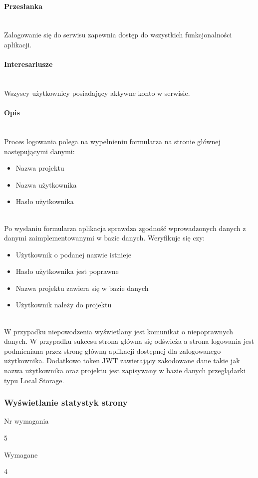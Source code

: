 \documentclass[eng,printmode]{mgr}
\begin{document}
\paragraph{Przesłanka}\ \\
Zalogowanie się do serwisu zapewnia dostęp do wszystkich funkcjonalności aplikacji.

\paragraph{Interesariusze}\ \\
Wszyscy użytkownicy posiadający aktywne konto w serwisie.

\paragraph{Opis}\ \\
Proces logowania polega na wypełnieniu formularza na stronie głównej następującymi danymi:
\begin{itemize}
	\item[--] Nazwa projektu
	\item[--] Nazwa użytkownika
	\item[--] Hasło użytkownika
\end{itemize}
\ \\
Po wysłaniu formularza aplikacja sprawdza zgodność wprowadzonych danych z danymi zaimplementowanymi w bazie danych. Weryfikuje się czy:
\begin{itemize}
	\item[--] Użytkownik o podanej nazwie istnieje
	\item[--] Hasło użytkownika jest poprawne
	\item[--] Nazwa projektu zawiera się w bazie danych
	\item[--] Użytkownik należy do projektu
\end{itemize}
\ \\
W przypadku niepowodzenia wyświetlany jest komunikat o niepoprawnych danych. W przypadku sukcesu strona główna się odświeża a strona logowania jest podmieniana przez stronę główną aplikacji dostępnej dla zalogowanego użytkownika. Dodatkowo token JWT zawierający zakodowane dane takie jak nazwa użytkownika oraz projektu jest zapisywany w bazie danych przeglądarki typu Local Storage\cite {local_storage}.
\newpage

\subsubsection{Wyświetlanie statystyk strony}
\begin{labeling}{Nr wymagania}
\item [Nr wymagania:] 5
\item [Typ:] Wymagane
\item [Powiązania:] 4
\end{labeling}
\end{document}
